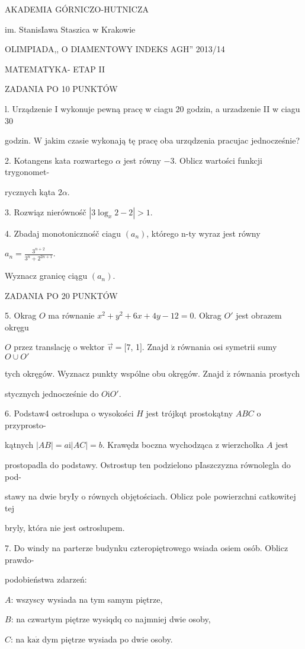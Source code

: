 \documentclass[a4paper,12pt]{article}
\begin{document}
AKADEMIA GÓRNICZO-HUTNICZA

im. StanisIawa Staszica w Krakowie

OLIMPIADA,, O DIAMENTOWY INDEKS AGH'' 2013/14

MATEMATYKA- ETAP II

ZADANIA PO 10 PUNKTÓW

l. Urządzenie I wykonuje pewną pracę w ciagu 20 godzin, a urzadzenie II w ciagu 30

godzin. $\mathrm{W}$ jakim czasie wykonają tę pracę oba urzqdzenia pracujac jednocześnie?

2. Kotangens kata rozwartego $\alpha$ jest równy $-3$. Oblicz wartości funkcji trygonomet-

rycznych kąta $2\alpha.$

3. Rozwiąz nierównośč $|3\log_{x}2-2|>1.$

4. Zbadaj monotonicznośč ciagu $(a_{n})$, którego n-ty wyraz jest równy

$a_{n}=\displaystyle \frac{3^{n+2}}{3^{n}+2^{2n+1}}.$

Wyznacz granicę ciągu $(a_{n}).$

ZADANIA PO 20 PUNKTÓW

5. Okrag $O$ ma równanie $x^{2}+y^{2}+6x+4y-12=0$. Okrag $O'$ jest obrazem okręgu

$O$ przez translację o wektor $\vec{v}= [7$, 1$].$ Znajd $\acute{\mathrm{z}}$ równania osi symetrii sumy $O\cup O'$

tych okręgów. Wyznacz punkty wspólne obu okręgów. Znajd $\acute{\mathrm{z}}$ równania prostych

stycznych jednocześnie do $O\mathrm{i}O'.$

6. Podstaw4 ostroslupa o wysokości $H$ jest trójkqt prostokątny $ABC$ o przyprosto-

kątnych $|AB| =a\mathrm{i} |AC| =b$. Krawędz$\acute{}$ boczna wychodząca z wierzcholka $A$ jest

prostopadla do podstawy. Ostrostup ten podzielono pIaszczyzna równolegla do pod-

stawy na dwie bryIy o równych objętościach. Oblicz pole powierzchni catkowitej tej

bryly, która nie jest ostroslupem.

7. Do windy na parterze budynku czteropiętrowego wsiada osiem osób. Oblicz prawdo-

podobieństwa zdarzeń:

$A$: wszyscy wysiada na tym samym piętrze,

$B$: na czwartym piętrze wysiqdq co najmniej dwie osoby,

$C$: na $\mathrm{k}\mathrm{a}\dot{\mathrm{z}}$ dym piętrze wysiada po dwie osoby.
\end{document}
